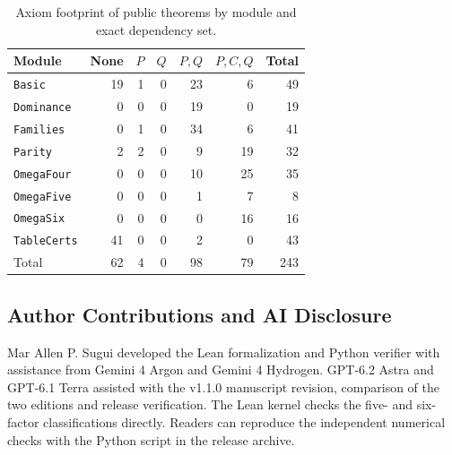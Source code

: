 \documentclass[11pt,reqno]{amsart}
\theoremstyle{plain}
\theoremstyle{definition}
\theoremstyle{remark}
\newcommand{\leanid}[1]{\texttt{\upshape\def\_{\char95\relax}#1}}
\begin{document}
\begin{table}[htbp]
\centering
\caption{Axiom footprint of public theorems by module and exact dependency set.}
\label{tab:axioms}
\small
\begin{tabular}{@{}lrrrrrr@{}}
\toprule
Module & None & $P$ & $Q$ & $P,Q$ & $P,C,Q$ & Total \\
\midrule
\leanid{Basic} & 19 & 1 & 0 & 23 & 6 & 49 \\
\leanid{Dominance} & 0 & 0 & 0 & 19 & 0 & 19 \\
\leanid{Families} & 0 & 1 & 0 & 34 & 6 & 41 \\
\leanid{Parity} & 2 & 2 & 0 & 9 & 19 & 32 \\
\leanid{OmegaFour} & 0 & 0 & 0 & 10 & 25 & 35 \\
\leanid{OmegaFive} & 0 & 0 & 0 & 1 & 7 & 8 \\
\leanid{OmegaSix} & 0 & 0 & 0 & 0 & 16 & 16 \\
\leanid{TableCerts} & 41 & 0 & 0 & 2 & 0 & 43 \\
Total & 62 & 4 & 0 & 98 & 79 & 243 \\
\bottomrule
\end{tabular}
\end{table}

\FloatBarrier
\subsection*{Author Contributions and AI Disclosure}
Mar Allen P. Sugui developed the Lean formalization and Python verifier with assistance from Gemini 4 Argon and Gemini 4 Hydrogen. GPT-6.2 Astra and GPT-6.1 Terra assisted with the v1.1.0 manuscript revision, comparison of the two editions and release verification. The Lean kernel checks the five- and six-factor classifications directly. Readers can reproduce the independent numerical checks with the Python script in the release archive.
\end{document}

